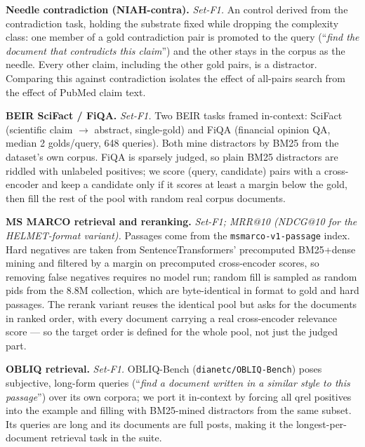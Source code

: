 \textbf{Needle contradiction (NIAH-contra).} \emph{Set-F1.} An  control derived from the  contradiction task, holding the substrate fixed while dropping the complexity class: one member of a gold contradiction pair is promoted to the query (``\emph{find the document that contradicts this claim}'') and the other stays in the corpus as the needle. Every other claim, including the other gold pairs, is a distractor. Comparing this against contradiction isolates the effect of all-pairs search from the effect of PubMed claim text.

\textbf{BEIR SciFact / FiQA.} \emph{Set-F1.} Two BEIR tasks framed in-context: SciFact (scientific claim $\to$ abstract, single-gold) and FiQA (financial opinion QA, median 2 golds/query, 648 queries). Both mine distractors by BM25 from the dataset's own corpus. FiQA is sparsely judged, so plain BM25 distractors are riddled with unlabeled positives; we score (query, candidate) pairs with a cross-encoder and keep a candidate only if it scores at least a margin below the gold, then fill the rest of the pool with random real corpus documents.

\textbf{MS MARCO retrieval and reranking.} \emph{Set-F1; MRR@10 (NDCG@10 for the HELMET-format variant).} Passages come from the \texttt{msmarco-v1-passage} index. Hard negatives are taken from SentenceTransformers' precomputed BM25+dense mining and filtered by a margin on precomputed cross-encoder scores, so removing false negatives requires no model run; random fill is sampled as random pids from the 8.8M collection, which are byte-identical in format to gold and hard passages. The rerank variant reuses the identical pool but asks for the documents in ranked order, with every document carrying a real cross-encoder relevance score --- so the target order is defined for the whole pool, not just the judged part.

\textbf{OBLIQ retrieval.} \emph{Set-F1.} OBLIQ-Bench (\texttt{dianetc/OBLIQ-Bench}) poses subjective, long-form queries (``\emph{find a document written in a similar style to this passage}'') over its own corpora; we port it in-context by forcing all qrel positives into the example and filling with BM25-mined distractors from the same subset. Its queries are long and its documents are full posts, making it the longest-per-document retrieval task in the suite.

